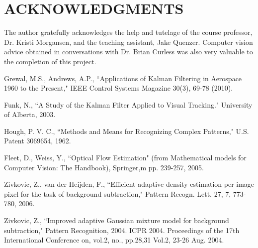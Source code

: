 \documentclass[letterpaper, 10 pt, conference]{ieeeconf}  %
\begin{document}
\section{ACKNOWLEDGMENTS}

The author gratefully acknowledges the help and tutelage of the course professor, Dr. Kristi Morgansen, and the teaching assistant, Jake Quenzer. Computer vision advice obtained in conversations with Dr. Brian Curless was also very valuable to the completion of this project.


\begin{thebibliography}{99}

Grewal, M.S., Andrews, A.P., ``Applications of Kalman Filtering in Aerospace 1960 to the Present," IEEE Control Systems Magazine 30(3), 69-78 (2010).

Funk, N., ``A Study of the Kalman Filter Applied to Visual Tracking." University of Alberta, 2003.

Hough, P. V. C., ``Methods and Means for Recognizing Complex Patterns," U.S. Patent 3069654, 1962.

Fleet, D., Weiss, Y., ``Optical Flow Estimation" (from Mathematical models for Computer Vision: The Handbook), Springer,m pp. 239-257, 2005.

Zivkovic, Z., van der Heijden, F., ``Efficient adaptive density estimation per image pixel for the task of background subtraction," Pattern Recogn. Lett. 27, 7, 773-780, 2006.

Zivkovic, Z., ``Improved adaptive Gaussian mixture model for background subtraction," Pattern Recognition, 2004. ICPR 2004. Proceedings of the 17th International Conference on, vol.2, no., pp.28,31 Vol.2, 23-26 Aug. 2004.

\end{thebibliography}
\end{document}
